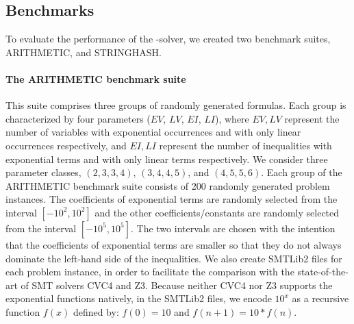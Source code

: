 \subsection{Benchmarks}

To evaluate the performance of the {\paexp}-solver, we created two benchmark suites, ARITHMETIC, and STRINGHASH.

\paragraph{The ARITHMETIC benchmark suite} 
This suite comprises three groups of randomly generated {\paexp} formulas. Each group is characterized by four parameters ($EV$, $LV$, $EI$, $LI$), where $EV, LV$ represent the number of variables with exponential occurrences and with only linear occurrences respectively, and $EI, LI$ represent the number of inequalities with exponential terms and with only linear terms respectively. 
We consider three parameter classes, $(2, 3, 3, 4)$, $(3, 4, 4, 5)$, and $(4, 5, 5, 6)$. 
Each group of the ARITHMETIC benchmark suite consists of 200 randomly generated problem instances. The coefficients of exponential terms are randomly selected from the interval $[-10^2, 10^2]$ and the other coefficients/constants are randomly selected from the interval $[-10^5, 10^5]$. The two intervals are chosen with the intention that the coefficients of exponential terms are smaller so that they do not always dominate the left-hand side of the inequalities. We also create SMTLib2 files for each problem instance, in order to facilitate the comparison with the state-of-the-art of SMT solvers CVC4 and Z3. Because neither CVC4 nor Z3 supports the exponential functions natively, in the SMTLib2 files, we encode $10^x$ as a recursive function $f(x)$ defined by: $f(0) = 10$ and $f(n+1) = 10*f(n)$.

%

